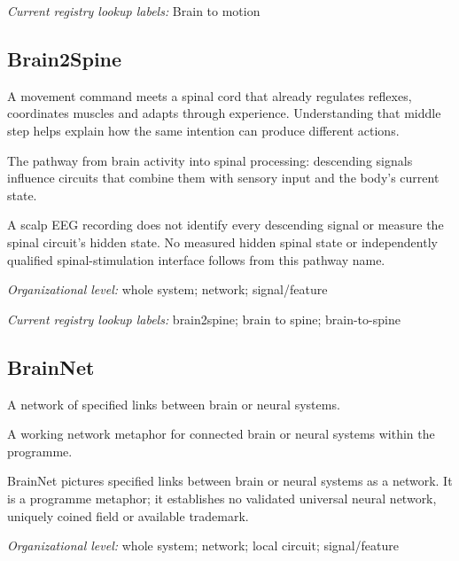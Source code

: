 \noindent\textit{Current registry lookup labels:} Brain to motion\par

\begin{samepage}
\subsection*{Brain2Spine}
\noindent A movement command meets a spinal cord that already regulates reflexes, coordinates muscles and adapts through experience. Understanding that middle step helps explain how the same intention can produce different actions.\par
\end{samepage}
\noindent The pathway from brain activity into spinal processing: descending signals influence circuits that combine them with sensory input and the body's current state.\par
\noindent A scalp EEG recording does not identify every descending signal or measure the spinal circuit's hidden state. No measured hidden spinal state or independently qualified spinal-stimulation interface follows from this pathway name.\par
\begin{samepage}
\noindent\textit{Organizational level:} whole system; network; signal/feature\par\nopagebreak[4]

\end{samepage}


\noindent\textit{Current registry lookup labels:} brain2spine; brain to spine; brain-to-spine\par

\begin{samepage}
\subsection*{BrainNet}
\noindent A network of specified links between brain or neural systems.\par
\end{samepage}
\noindent A working network metaphor for connected brain or neural systems within the programme.\par
\noindent BrainNet pictures specified links between brain or neural systems as a network. It is a programme metaphor; it establishes no validated universal neural network, uniquely coined field or available trademark.\par
\begin{samepage}
\noindent\textit{Organizational level:} whole system; network; local circuit; signal/feature\par\nopagebreak[4]

\end{samepage}


